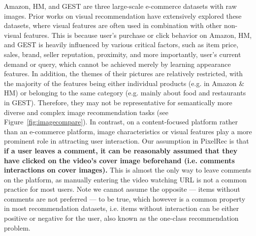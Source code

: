 \documentclass[sigconf]{acmart}
\begin{document}
Amazon, HM, and GEST are three large-scale e-commerce datasets with raw images. Prior works on visual recommendation \cite{he2016vbpr,he2016ups,du2020learn} have extensively explored these datasets, where visual features are often used in combination with other non-visual features. This is because  user's purchase or click behavior on Amazon, HM,  and GEST is heavily  influenced by various critical factors, such as item price,  sales, brand, seller reputation, proximity, and more importantly, user's current demand  or query, which cannot be achieved merely  by learning appearance features.  
In addition, the themes of their pictures are relatively restricted,  with the majority of the features being either individual  products (e.g. in Amazon \&  HM) or  belonging to the same category (e.g. mainly about food and restaurants in GEST).
 Therefore, they may not be representative  for semantically  more diverse and complex image recommendation tasks (see Figure~\ref{fig:imagecompare}).
In contrast, on a content-focused platform rather than an e-commerce platform,  image characteristics or visual features play a more prominent role in attracting user interaction.
Our assumption in PixelRec is that \textbf{if a user leaves a comment, it can be reasonably assumed that they have clicked on the video's cover image beforehand (i.e. comments   interactions on cover images). } This is almost the only way to leave comments on the  platform, as manually entering the video watching URL is not a common practice for most users. Note we cannot assume the opposite --- items without comments are not preferred ---  to be true, which however is a common property in most recommendation datasets, i.e. items without interaction can be either positive or negative for the user, also known as the one-class recommendation problem.
\end{document}
